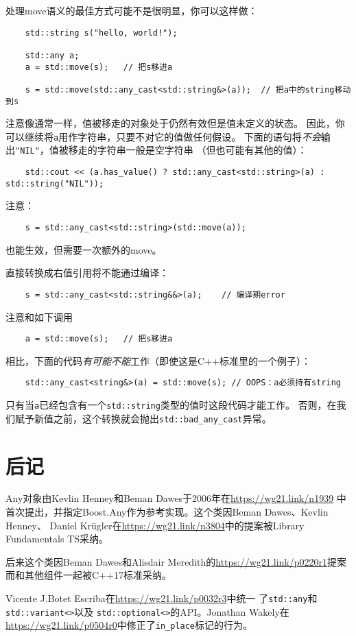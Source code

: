 处理move语义的最佳方式可能不是很明显，你可以这样做：
\begin{lstlisting}
    std::string s("hello, world!");

    std::any a;
    a = std::move(s);   // 把s移进a

    s = std::move(std::any_cast<std::string&>(a));  // 把a中的string移动到s
\end{lstlisting}
注意像通常一样，值被移走的对象处于仍然有效但是值未定义的状态。
因此，你可以继续将\texttt{a}用作字符串，只要不对它的值做任何假设。
下面的语句将\emph{不会}输出\texttt{"NIL"}，值被移走的字符串一般是空字符串
（但也可能有其他的值）：
\begin{lstlisting}
    std::cout << (a.has_value() ? std::any_cast<std::string>(a) : std::string("NIL"));
\end{lstlisting}
注意：
\begin{lstlisting}
    s = std::any_cast<std::string>(std::move(a));
\end{lstlisting}
也能生效，但需要一次额外的move。

直接转换成右值引用将不能通过编译：
\begin{lstlisting}
    s = std::any_cast<std::string&&>(a);    // 编译期error
\end{lstlisting}
注意和如下调用
\begin{lstlisting}
    a = std::move(s);   // 把s移进a
\end{lstlisting}
相比，下面的代码\emph{有可能不能}工作（即使这是C++标准里的一个例子）：
\begin{lstlisting}
    std::any_cast<string&>(a) = std::move(s); // OOPS：a必须持有string
\end{lstlisting}
只有当\texttt{a}已经包含有一个\texttt{std::string}类型的值时这段代码才能工作。
否则，在我们赋予新值之前，这个转换就会抛出\texttt{std::bad\_any\_cast}异常。


\section{后记}
Any对象由Kevlin Henney和Beman Dawes于2006年在\url{https://wg21.link/n1939}
中首次提出，并指定Boost.Any作为参考实现。这个类因Beman Dawes、Kevlin Henney、
Daniel Krügler在\url{https://wg21.link/n3804}中的提案被Library Fundamentals TS采纳。

后来这个类因Beman Dawes和Alisdair Meredith的\url{https://wg21.link/p0220r1}提案
而和其他组件一起被C++17标准采纳。

Vicente J.Botet Escriba在\url{https://wg21.link/p0032r3}中统一
了\texttt{std::any}和\texttt{std::variant<>}以及
\texttt{std::optional<>}的API。Jonathan Wakely在
\url{https://wg21.link/p0504r0}中修正了\texttt{in\_place}标记的行为。